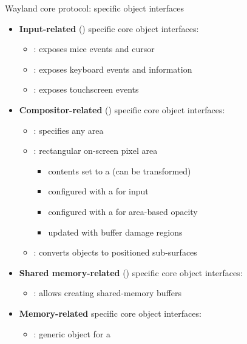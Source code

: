 \begin{frame}{Wayland core protocol: specific object interfaces}
  \begin{itemize}
  \item \textbf{Input-related} () specific core object interfaces:
    \begin{itemize}
    \item {}: exposes mice events and cursor
    \item {}: exposes keyboard events and information
    \item {}: exposes touchscreen events
    \end{itemize}
  \item \textbf{Compositor-related} () specific core object interfaces:
    \begin{itemize}
    \item {}: specifies any area
    \item {}: rectangular on-screen pixel area
      \begin{itemize}
      \item contents set to a  (can be transformed)
      \item configured with a  for input
      \item configured with a  for area-based opacity
      \item updated with buffer damage regions
      \end{itemize}
    \item {}: converts  objects to positioned sub-surfaces
    \end{itemize}
  \item \textbf{Shared memory-related} () specific core object interfaces:
    \begin{itemize}
    \item {}: allows creating shared-memory buffers
    \end{itemize}
  \item \textbf{Memory-related} specific core object interfaces:
    \begin{itemize}
    \item {}: generic object for a 
    \end{itemize}
  \end{itemize}
\end{frame}

